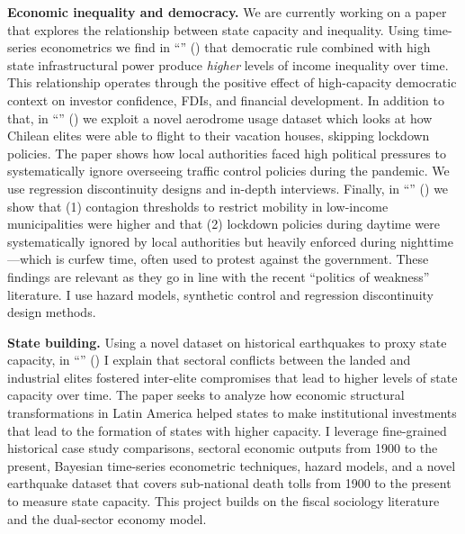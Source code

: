 {\bf Economic inequality and democracy.} We are currently working on a paper that explores the relationship between state capacity and inequality. Using time-series econometrics we find in ``\href{https://github.com/hbahamonde/Inequality_State_Capacity/raw/main/Bahamonde_Trasberg.pdf}{\unskip}'' ({\unskip}) that democratic rule combined with high state infrastructural power produce \emph{higher} levels of income inequality over time. This relationship operates through the positive effect of high-capacity democratic context on investor confidence, FDIs, and financial development. In addition to that, in ``\href{https://raw.githubusercontent.com/hbahamonde/Tobalaba/master/abstract.txt}{{\unskip}}'' (\emph{\unskip}) we exploit a novel aerodrome usage dataset which looks at how Chilean elites were able to flight to their vacation houses, skipping lockdown policies. The paper shows how local authorities faced high political pressures to systematically ignore overseeing traffic control policies during the pandemic. We use regression discontinuity designs and in-depth interviews. Finally, in ``\href{https://github.com/hbahamonde/Bus/raw/main/abstract.txt}{{\unskip}}'' (\emph{\unskip}) we show that (1) contagion thresholds to restrict mobility in low-income municipalities were higher and that (2) lockdown policies during daytime were systematically ignored by local authorities but heavily enforced during nighttime---which is curfew time, often used to protest against the government. These findings are relevant as they go in line with the recent ``politics of weakness'' literature. I use hazard models, synthetic control and regression discontinuity design methods.

{\bf State building.} Using a novel dataset on historical earthquakes to proxy state capacity, in ``\href{https://github.com/hbahamonde/Earthquake_Paper/raw/master/Bahamonde_Earthquake_Paper.pdf}{{\unskip}}'' ({\unskip}) I explain that sectoral conflicts between the landed and industrial elites fostered inter-elite compromises that lead to higher levels of state capacity over time. The paper seeks to analyze how economic structural transformations in Latin America helped states to make institutional investments that lead to the formation of states with higher capacity. I leverage fine-grained historical case study comparisons, sectoral economic outputs from 1900 to the present, Bayesian time-series econometric techniques, hazard models, and a novel earthquake dataset that covers sub-national death tolls from 1900 to the present to measure state capacity. This project builds on the fiscal sociology literature and the dual-sector economy model. 


